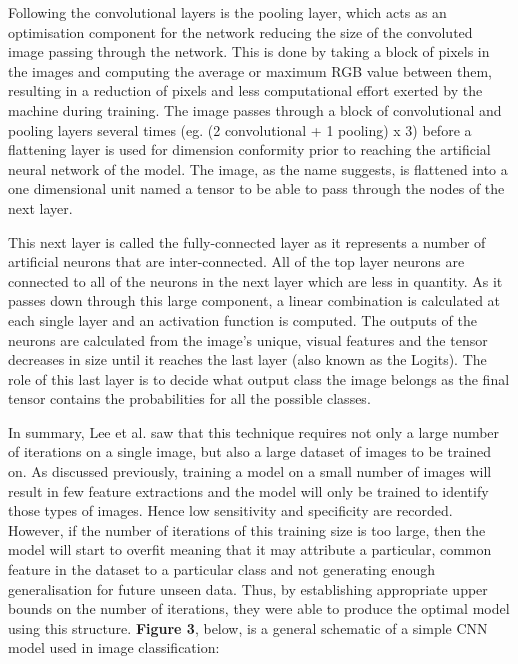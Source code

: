 \documentclass[a4paper]{article}
\begin{document}
        Following the convolutional layers is the pooling layer, which acts as an optimisation component for the network reducing the size of the convoluted image passing through the network. This is done by taking a block of pixels in the images and computing the average or maximum RGB value between them, resulting in a reduction of pixels and less computational effort exerted by the machine during training. The image passes through a block of convolutional and pooling layers several times (eg. (2 convolutional + 1 pooling) x 3) before a flattening layer is used for dimension conformity prior to reaching the artificial neural network of the model. The image, as the name suggests, is flattened into a one dimensional unit named a tensor to be able to pass through the nodes of the next layer.
        \vspace{3mm}

        This next layer is called the fully-connected layer as it represents a number of artificial neurons that are inter-connected. All of the top layer neurons are connected to all of the neurons in the next layer which are less in quantity. As it passes down through this large component, a linear combination is calculated at each single layer and an activation function is computed. The outputs of the neurons are calculated from the image's unique, visual features and the tensor decreases in size until it reaches the last layer (also known as the Logits). The role of this last layer is to decide what output class the image belongs as the final tensor contains the probabilities for all the possible classes.
        \vspace{3mm}

        In summary, Lee et al. saw that this technique requires not only a large number of iterations on a single image, but also a large dataset of images to be trained on. As discussed previously, training a model on a small number of images will result in few feature extractions and the model will only be trained to identify those types of images. Hence low sensitivity and specificity are recorded. However, if the number of iterations of this training size is too large, then the model will start to overfit meaning that it may attribute a particular, common feature in the dataset to a particular class and not generating enough generalisation for future unseen data. Thus, by establishing appropriate upper bounds on the number of iterations, they were able to produce the optimal model using this structure. \textbf{Figure 3}, below, is a general schematic of a simple CNN model used in image classification:
        \vspace{3mm}
\end{document}
